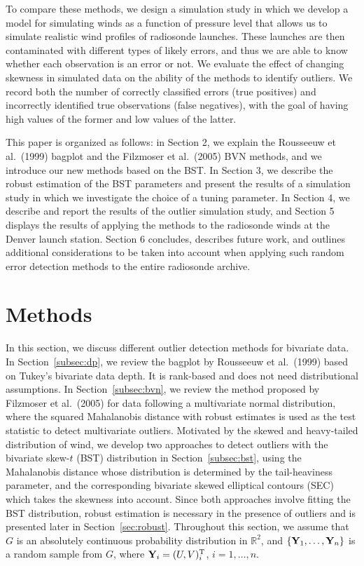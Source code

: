 \documentclass[12pt]{article}
\def\trans{^{\rm T}}
\def\bY{{\bf Y}}
\def\R{\mathbb R}
\def\R{\mathbb{R}}
\def\bY{{\bf Y}}
\begin{document}
\begin{doublespacing}
To compare these methods, we  design a simulation study in which we develop a model for simulating  winds as a function of pressure level that allows us to simulate realistic wind profiles of  radiosonde launches.  These launches are then contaminated with  different types of likely errors, and thus we are able to know whether each observation is an error or not.  We  evaluate the effect of changing skewness in simulated data on the ability of  the methods to identify outliers.  We record both the number of correctly classified errors (true positives) and incorrectly identified true observations (false negatives), with the goal of having high values of the former and low values of the latter.


This paper is organized as follows:  in Section 2, we  explain the  Rousseeuw et al.~(1999) bagplot and the Filzmoser et al.~(2005) BVN methods, and we  introduce our new methods based on the BST. In Section 3, we describe the robust estimation of the BST parameters and present the results of a simulation study in which we investigate the choice of a tuning parameter.  In Section 4, we describe and report the results of the outlier simulation study, and Section 5 displays the results of applying the methods to the radiosonde winds at the Denver launch station.  Section 6 concludes, describes future work,  and outlines additional  considerations  to be taken into account when applying such random error detection methods to the entire radiosonde archive.



\section{Methods}\label{sec:method}
In this section, we discuss different outlier detection methods for bivariate data. In Section~\ref{subsec:dp}, we review the bagplot by Rousseeuw et al.~(1999) based on Tukey's bivariate data depth. It is rank-based and does not need distributional assumptions. In Section~\ref{subsec:bvn}, we review the method proposed by Filzmoser et al.~(2005) for data following a  multivariate normal distribution, where the squared Mahalanobis distance with robust estimates is used as the test statistic to detect multivariate outliers. Motivated by the skewed and heavy-tailed distribution of wind, we develop two approaches to detect outliers with the bivariate skew-$t$ (BST) distribution in Section~\ref{subsec:bst}, using the Mahalanobis distance whose distribution is determined by the tail-heaviness parameter, and the corresponding bivariate skewed elliptical contours (SEC) which takes the skewness into account. Since both approaches involve fitting the BST distribution,  robust estimation is necessary in the presence of outliers and is presented later in Section~\ref{sec:robust}. Throughout this section, we assume that $G$ is an absolutely continuous probability distribution in $\R^2$, and $\{\bY_1,\ldots,\bY_n\}$ is a random sample from $G$, where $\bY_i=(U,V)_i\trans$, $i=1,\ldots,n$.




\end{doublespacing}
\end{document}

